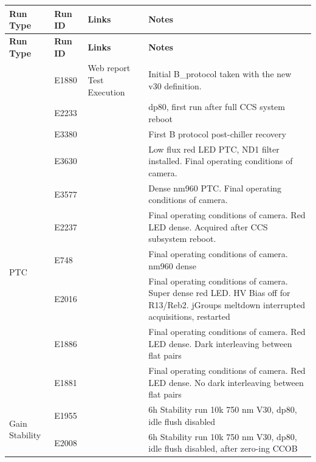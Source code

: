 \begin{longtable}{|p{2.5cm}|p{1.5cm}|p{2.9cm}|p{6.5cm}|}
\hline
\textbf{Run Type} & \textbf{Run ID} & \textbf{Links} & \textbf{Notes} \\ \hline
\endfirsthead
\hline
\textbf{Run Type} & \textbf{Run ID} & \textbf{Links} & \textbf{Notes} \\ \hline
\endhead
\hline
\endfoot
\hline
\endlastfoot

\multirow{3}{*}{B-protocol} & E1880 & Web report \newline Test Execution & Initial B\_protocol taken with the new v30 definition. \\ \cline{2-4} 
                            & E2233 &             & dp80, first run after full CCS system reboot \\ \cline{2-4} 
                            & E3380 &             & First B protocol post-chiller recovery \\ \hline

\multirow{7}{*}{PTC}        & E3630 &             & Low flux red LED PTC, ND1 filter installed. Final operating conditions of camera. \\ \cline{2-4} 
                            & E3577 &             & Dense nm960 PTC. Final operating conditions of camera. \\ \cline{2-4} 
                            & E2237 &             & Final operating conditions of camera. Red LED dense. Acquired after CCS subsystem reboot. \\ \cline{2-4} 
                            & E748  &             & Final operating conditions of camera. nm960 dense \\ \cline{2-4} 
                            & E2016 &             & Final operating conditions of camera. Super dense red LED. HV Bias off for R13/Reb2. jGroups meltdown interrupted acquisitions, restarted \\ \cline{2-4} 
                            & E1886 &             & Final operating conditions of camera. Red LED dense. Dark interleaving between flat pairs \\ \cline{2-4} 
                            & E1881 &             & Final operating conditions of camera. Red LED dense. No dark interleaving between flat pairs \\ \hline

\multirow{3}{*}{Gain Stability} & E1955 &          & 6h Stability run 10k 750 nm V30, dp80, idle flush disabled \\ \cline{2-4} 
                                & E2008 &          & 6h Stability run 10k 750 nm V30, dp80, idle flush disabled, after zero-ing CCOB \\ \hline


\end{longtable}
